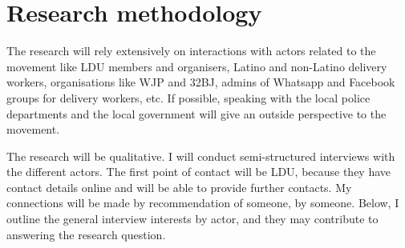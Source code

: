 \documentclass{article}
\begin{document}
\section{Research methodology}

\begin{comment}

The research methods appropriate for the proposed research
If you plan to conduct field work or collect empirical data, you should provide details about this (e.g. if you plan interviews, who will you interview? How many interviews will you conduct? Will there be problems of access?). This section should also explain how you are going to analyse your research findings.

Qualitative research: find meanings, opinions, underlying reasons from people; unstructured or semi structured; relatively small sample size; conversational; provides insights, in depth information; focus groups, experiments, interviews,...

\end{comment}

The research will rely extensively on interactions with actors related to the movement like LDU members and organisers, Latino and non-Latino delivery workers, organisations like WJP and 32BJ, admins of Whatsapp and Facebook groups for delivery workers, etc. If possible, speaking with the local police departments and the local government will give an outside perspective to the movement.

The research will be qualitative. I will conduct semi-structured interviews with the different actors. The first point of contact will be LDU, because they have contact details online and will be able to provide further contacts. My connections will be made by recommendation of someone, by someone. Below, I outline the general interview interests by actor, and they may contribute to answering the research question.
\end{document}
